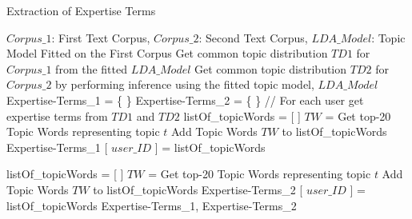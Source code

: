         \begin{algorithm}
            \caption{Extraction of Expertise Terms}
            \label{alg:RQ2}
            \begin{algorithmic}[1]
                \REQUIRE $Corpus\_1$: First Text Corpus, $Corpus\_2$: Second Text Corpus, $LDA\_Model$: Topic Model Fitted on the First Corpus
                \STATE Get common topic distribution $TD1$ for $Corpus\_1$ from the fitted $LDA\_Model$
                \STATE Get common topic distribution $TD2$ for $Corpus\_2$ by performing inference using the fitted topic model, $LDA\_Model$
                \STATE Expertise-Terms\_1 = \{ \}
                \STATE Expertise-Terms\_2 = \{ \}
                \STATE
                \STATE // For each user get expertise terms from $TD1$ and $TD2$ 
                    \STATE listOf\_topicWords = [ ]
                        \STATE $TW$ = Get top-20 Topic Words representing topic $t$
                        \STATE Add Topic Words $TW$ to listOf\_topicWords 
                    \ENDFOR
                    \STATE Expertise-Terms\_1 [ $user\_ID$ ] = listOf\_topicWords
                    \STATE
                    
                    \STATE listOf\_topicWords = [ ]
                        \STATE $TW$ = Get top-20 Topic Words representing topic $t$
                        \STATE Add Topic Words $TW$ to listOf\_topicWords 
                    \ENDFOR
                    \STATE Expertise-Terms\_2 [ $user\_ID$ ] = listOf\_topicWords
                    \STATE
                \ENDFOR
                \RETURN Expertise-Terms\_1, Expertise-Terms\_2
            \end{algorithmic}
        \end{algorithm}
        

